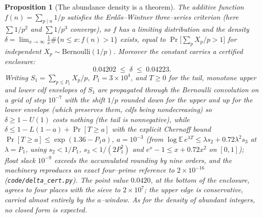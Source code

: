 \documentclass[11pt]{article}
\newtheorem{proposition}[theorem]{Proposition}
\theoremstyle{definition}
\begin{document}
\begin{proposition}[The abundance density is a theorem]\label{prop:density}
The additive function $f(n)=\sum_{p\mid n}1/p$ satisfies the Erd\H{o}s--Wintner three--series
criterion \cite{Tenenbaum} (here $\sum 1/p^2$ and $\sum 1/p^3$ converge), so $f$ has a limiting
distribution and the
density $\delta=\lim_{x\to\infty}\tfrac1x\#\{n\le x:f(n)>1\}$ exists, equal to $\Pr\bigl[\sum_p
X_p/p>1\bigr]$ for independent $X_p\sim\mathrm{Bernoulli}(1/p)$. Moreover the constant carries a
\emph{certified} enclosure:
\[ 0.04202\;\le\;\delta\;\le\;0.04223. \]
Writing $S_1=\sum_{p\le P_1}X_p/p$, $P_1=3\times10^4$, and $T\ge0$ for the tail, monotone upper and
lower cdf envelopes of $S_1$ are propagated through the Bernoulli convolution on a grid of step
$10^{-7}$ with the shift $1/p$ rounded down for the upper and up for the lower envelope (which
preserves them, cdfs being nondecreasing) so $\delta\ge1-U(1)$ costs nothing (the tail is
nonnegative), while $\delta\le1-L(1-a)+\Pr[T\ge a]$ with the explicit Chernoff bound
$\Pr[T\ge a]\le\exp(1.36-P_1a)$, $a=10^{-3}$ (from
$\log\mathbb{E}\,e^{\lambda T}\le\lambda s_2+0.72\lambda^2s_3$ at $\lambda=P_1$, using
$s_2<1/P_1$, $s_3<1/(2P_1^2)$ and $e^x-1\le x+0.72x^2$ on $[0,1]$); float slack $10^{-9}$ exceeds
the accumulated rounding by nine orders, and the machinery reproduces an exact four--prime
reference to $2\times10^{-16}$ (\texttt{code/delta\_cert.py}). The point value $0.0420$, at the
bottom of the enclosure, agrees to four places with the sieve to $2\times10^7$; the upper edge is
conservative, carried almost entirely by the $a$--window. As for the density of abundant integers,
no closed form is expected.
\end{proposition}
\end{document}
